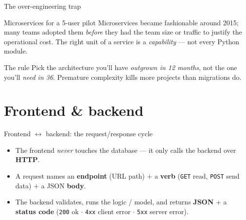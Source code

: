 \documentclass[aspectratio=169,11pt]{beamer}
\begin{document}
\begin{frame}{The over-engineering trap}
  \begin{alertblock}{Microservices for a 5-user pilot}
    Microservices became fashionable around 2015; many teams adopted them \emph{before} they had the team size or traffic to justify the operational cost. The right unit of a service is a \emph{capability} --- not every Python module.
  \end{alertblock}
  \begin{exampleblock}{The rule}
    Pick the architecture you'll have \emph{outgrown in 12 months}, not the one you'll \emph{need in 36}. Premature complexity kills more projects than migrations do.
  \end{exampleblock}
\end{frame}

\section{Frontend \& backend}
\begin{frame}{Frontend $\leftrightarrow$ backend: the request/response cycle}
  \begin{center}
  \end{center}
  \begin{itemize}
    \item The frontend \emph{never} touches the database --- it only calls the backend over \textbf{HTTP}.
    \item A request names an \textbf{endpoint} (URL path) $+$ a \textbf{verb} (\texttt{GET} read, \texttt{POST} send data) $+$ a JSON \textbf{body}.
    \item The backend validates, runs the logic / model, and returns \textbf{JSON} $+$ a \textbf{status code} (\texttt{200} ok $\cdot$ \texttt{4xx} client error $\cdot$ \texttt{5xx} server error).
  \end{itemize}
\end{frame}
\end{document}
